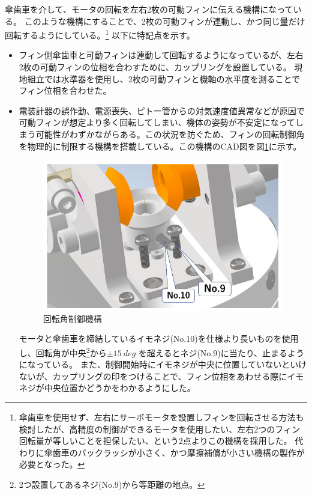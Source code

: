 \documentclass[a4paper,11pt,uplatex]{jsarticle}
\begin{document}
傘歯車を介して、モータの回転を左右2枚の可動フィンに伝える機構になっている。
このような機構にすることで、2枚の可動フィンが連動し、かつ同じ量だけ回転するようにしている。\footnote{
	傘歯車を使用せず、左右にサーボモータを設置しフィンを回転させる方法も検討したが、高精度の制御ができるモータを使用したい、左右2つのフィン回転量が等しいことを担保したい、という2点よりこの機構を採用した。
	代わりに傘歯車のバックラッシが小さく、かつ摩擦補償が小さい機構の製作が必要となった。}
以下に特記点を示す。
\begin{itemize}
	\item フィン側傘歯車と可動フィンは連動して回転するようになっているが、左右2枚の可動フィンの位相を合わすために、カップリングを設置している。
	      現地組立では水準器を使用し、2枚の可動フィンと機軸の水平度を測ることでフィン位相を合わせた。
	      \\
	\item 電装計器の誤作動、電源喪失、ピトー管からの対気速度値異常などが原因で可動フィンが想定より多く回転してしまい、機体の姿勢が不安定になってしまう可能性がわずかながらある。この状況を防ぐため、フィンの回転制御角を物理的に制限する機構を搭載している。この機構のCAD図を図\ref{s_r_kadouiki}に示す。
	      \begin{figure}[H]
		      \centering
		      \includegraphics[scale = 0.5]{pic_str/s_r_kadouiki.png}
		      \caption{回転角制御機構}
		      \label{s_r_kadouiki}
	      \end{figure}
	      モータと傘歯車を締結しているイモネジ(No.10)を仕様より長いものを使用し、回転角が中央\footnote{2つ設置してあるネジ(No.9)から等距離の地点。}から$\pm \SI{15}{deg}$ を超えるとネジ(No.9)に当たり、止まるようになっている。
	      また、制御開始時にイモネジが中央に位置していないといけないが、カップリングの印をつけることで、フィン位相をあわせる際にイモネジが中央位置かどうかをわかるようにした。

\end{itemize}
\end{document}
